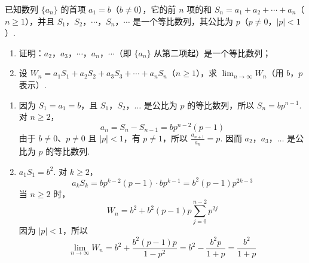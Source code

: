 \documentclass[UTF8,a4paper,oneside,11pt]{ctexbook}
\begin{document}
\begin{problem}
已知数列 \(\{a_{n}\}\) 的首项 \(a_{1} = b\)（\(b \neq 0\)），它的前 \(n\) 项的和 \(S_{n} = a_{1} + a_{2} + \cdots + a_{n}\)（\(n \geqslant 1\)），并且 \(S_{1}\)，\(S_{2}\)，\(\cdots\)，\(S_{n}\)，\(\cdots\) 是一个等比数列，其公比为 \(p\)（\(p \neq 0\)，\(|p| < 1\)）.

\begin{enumerate}
\item 证明：\(a_{2}\)，\(a_{3}\)，\(\cdots\)，\(a_{n}\)，\(\cdots\)（即 \(\{a_{n}\}\) 从第二项起）是一个等比数列；
\item 设 \(W_{n}=a_{1}S_{1}+a_{2}S_{2}+a_{3}S_{3}+\cdots+a_{n}S_{n}\)（\(n\geqslant1\)），求 \(\displaystyle\lim_{n\to\infty}W_{n}\)（用 \(b\)，\(p\) 表示）.
\end{enumerate}

\begin{solution}
\begin{enumerate}
\item 因为 \(S_{1}=a_{1}=b\)，且 \(S_{1}\)，\(S_{2}\)，\(\ldots\) 是公比为 \(p\) 的等比数列，所以 \(S_{n}=bp^{n-1}\). 对 \(n\geqslant2\)，
\[
a_{n}=S_{n}-S_{n-1}=bp^{n-2}(p-1)
\]
由于 \(b\neq0\)、\(p\neq0\) 且 \(|p|<1\)，有 \(p\neq1\)，所以 \(\frac{a_{n+1}}{a_{n}}=p\). 因而 \(a_{2}\)，\(a_{3}\)，\(\ldots\) 是公比为 \(p\) 的等比数列.
\item \(a_{1}S_{1}=b^{2}\). 对 \(k\geqslant2\)，
\[
a_{k}S_{k}=bp^{k-2}(p-1)\cdot bp^{k-1}=b^{2}(p-1)p^{2k-3}
\]
当 \(n\geqslant2\) 时，
\[
W_{n}=b^{2}+b^{2}(p-1)p\sum_{j=0}^{n-2}p^{2j}
\]
因为 \(|p|<1\)，所以
\[
\lim_{n\to\infty}W_{n}=b^{2}+\frac{b^{2}(p-1)p}{1-p^{2}}=b^{2}-\frac{b^{2}p}{1+p}=\frac{b^{2}}{1+p}
\]
\end{enumerate}
\end{solution}
\end{problem}
\end{document}
